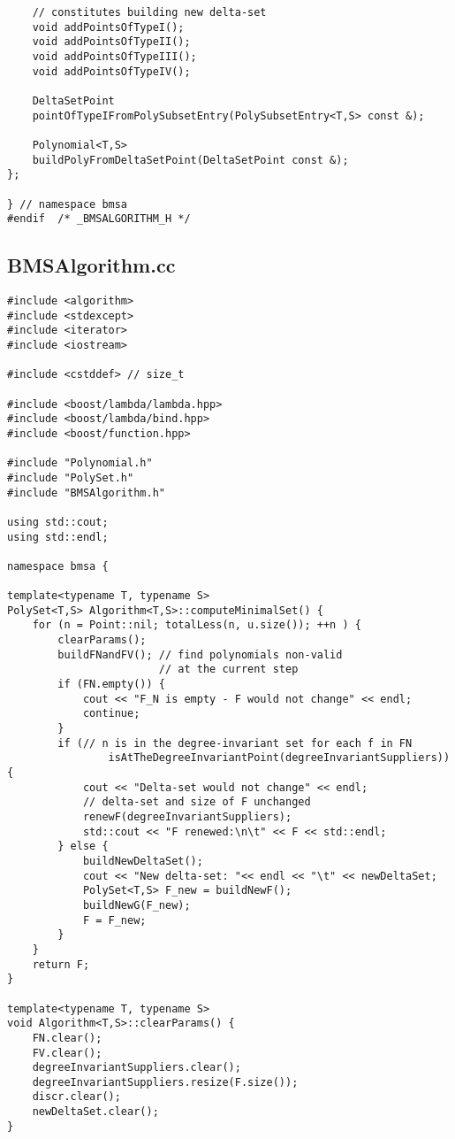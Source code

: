 \begin{lstlisting}
    // constitutes building new delta-set
    void addPointsOfTypeI();
    void addPointsOfTypeII();
    void addPointsOfTypeIII();
    void addPointsOfTypeIV();

    DeltaSetPoint
    pointOfTypeIFromPolySubsetEntry(PolySubsetEntry<T,S> const &);

    Polynomial<T,S>
    buildPolyFromDeltaSetPoint(DeltaSetPoint const &);
};

} // namespace bmsa
#endif	/* _BMSALGORITHM_H */
\end{lstlisting}

\subsection*{BMSAlgorithm.cc}
\begin{lstlisting}
#include <algorithm>
#include <stdexcept>
#include <iterator>
#include <iostream>

#include <cstddef> // size_t

#include <boost/lambda/lambda.hpp>
#include <boost/lambda/bind.hpp>
#include <boost/function.hpp>

#include "Polynomial.h"
#include "PolySet.h"
#include "BMSAlgorithm.h"

using std::cout;
using std::endl;

namespace bmsa {

template<typename T, typename S>
PolySet<T,S> Algorithm<T,S>::computeMinimalSet() {
    for (n = Point::nil; totalLess(n, u.size()); ++n ) {
        clearParams();
        buildFNandFV(); // find polynomials non-valid
                        // at the current step
        if (FN.empty()) {
            cout << "F_N is empty - F would not change" << endl;
            continue;
        }
        if (// n is in the degree-invariant set for each f in FN
                isAtTheDegreeInvariantPoint(degreeInvariantSuppliers)) {
            cout << "Delta-set would not change" << endl;
            // delta-set and size of F unchanged
            renewF(degreeInvariantSuppliers);
            std::cout << "F renewed:\n\t" << F << std::endl;
        } else {
            buildNewDeltaSet();
            cout << "New delta-set: "<< endl << "\t" << newDeltaSet;
            PolySet<T,S> F_new = buildNewF();
            buildNewG(F_new);
            F = F_new;
        }
    }
    return F;
}

template<typename T, typename S>
void Algorithm<T,S>::clearParams() {
    FN.clear();
    FV.clear();
    degreeInvariantSuppliers.clear();
    degreeInvariantSuppliers.resize(F.size());
    discr.clear();
    newDeltaSet.clear();
}


\end{lstlisting}
